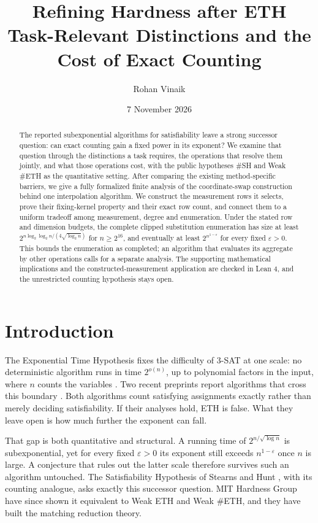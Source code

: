 \documentclass[11pt,letterpaper]{article}
\title{Refining Hardness after ETH\\[0.5em]{\large Task-Relevant
Distinctions and the Cost of Exact Counting}}
\author{Rohan Vinaik}
\date{\small 7 November 2026}
\begin{document}
\maketitle
\begin{abstract}
The reported subexponential algorithms for satisfiability leave a strong
successor question: can exact counting gain a fixed power in its
exponent? We examine that question through the distinctions a task
requires, the operations that resolve them jointly, and what those
operations cost, with the public hypotheses \#SH and Weak \#ETH as the
quantitative setting. After comparing the existing method-specific
barriers, we give a fully formalized finite analysis of the
coordinate-swap construction behind one interpolation algorithm. We
construct the measurement rows it selects, prove their fixing-kernel
property and their exact row count, and connect them to a uniform
tradeoff among measurement, degree and enumeration. Under the stated row
and dimension budgets, the complete clipped substitution enumeration has
size at least \(2^{n\log_2\log_2 n/(4\sqrt{\log_2 n})}\) for
\(n\ge2^{16}\), and eventually at least \(2^{n^{1-\varepsilon}}\) for
every fixed \(\varepsilon>0\). This bounds the enumeration as completed;
an algorithm that evaluates its aggregate by other operations calls for
a separate analysis. The supporting mathematical implications and the
constructed-measurement application are checked in Lean 4, and the
unrestricted counting hypothesis stays open.
\end{abstract}
\section{Introduction}\label{introduction}

The Exponential Time Hypothesis fixes the difficulty of 3-SAT at one
scale: no deterministic algorithm runs in time \(2^{o(n)}\), up to
polynomial factors in the input, where \(n\) counts the variables
\citep{IPZ01}. Two recent preprints report algorithms that cross this
boundary \citep{O26, Ant26}. Both algorithms count satisfying
assignments exactly rather than merely deciding satisfiability. If their
analyses hold, ETH is false. What they leave open is how much further
the exponent can fall.

That gap is both quantitative and structural. A running time of
\(2^{n/\sqrt{\log n}}\) is subexponential, yet for every fixed
\(\varepsilon>0\) its exponent still exceeds \(n^{1-\varepsilon}\) once
\(n\) is large. A conjecture that rules out the latter scale therefore
survives such an algorithm untouched. The Satisfiability Hypothesis of
Stearns and Hunt \citep{SH90}, with its counting analogue, asks exactly
this successor question. MIT Hardness Group \citep{SH26} have since
shown it equivalent to Weak ETH and Weak \#ETH, and they have built the
matching reduction theory.
\end{document}
